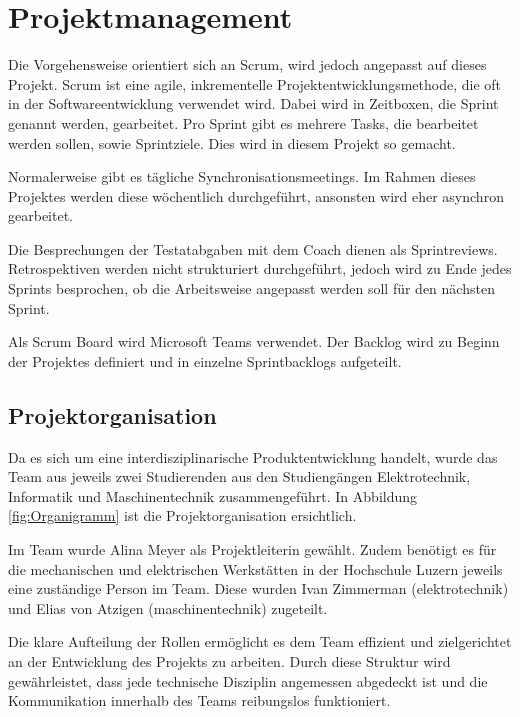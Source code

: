 \section{Projektmanagement}

Die Vorgehensweise orientiert sich an Scrum, wird jedoch angepasst auf dieses Projekt.
Scrum ist eine agile, inkrementelle Projektentwicklungsmethode, die oft in der Softwareentwicklung verwendet wird. Dabei wird in Zeitboxen, die Sprint genannt werden, gearbeitet. Pro Sprint gibt es mehrere Tasks, die bearbeitet werden sollen, sowie Sprintziele. Dies wird in diesem Projekt so gemacht.\cite{wikipedia-scrum}

Normalerweise gibt es tägliche Synchronisationsmeetings. Im Rahmen dieses Projektes werden diese wöchentlich durchgeführt, ansonsten wird eher asynchron gearbeitet.

Die Besprechungen der Testatabgaben mit dem Coach dienen als Sprintreviews. Retrospektiven werden nicht strukturiert durchgeführt, jedoch wird zu Ende jedes Sprints besprochen, ob die Arbeitsweise angepasst werden soll für den nächsten Sprint.

Als Scrum Board wird Microsoft Teams verwendet. Der Backlog wird zu Beginn der Projektes definiert und in einzelne Sprintbacklogs aufgeteilt.

\subsection{Projektorganisation}

Da es sich um eine interdisziplinarische Produktentwicklung handelt, wurde das Team aus jeweils zwei Studierenden aus den Studiengängen Elektrotechnik, Informatik und Maschinentechnik zusammengeführt. In Abbildung \ref{fig:Organigramm} ist die Projektorganisation ersichtlich. 

Im Team wurde Alina Meyer als Projektleiterin gewählt. Zudem benötigt es für die mechanischen und elektrischen Werkstätten in der Hochschule Luzern jeweils eine zuständige Person im Team. Diese wurden Ivan Zimmerman (\acrshort{elektrotechnik}) und Elias von Atzigen (\acrshort{maschinentechnik}) zugeteilt.

Die klare Aufteilung der Rollen ermöglicht es dem Team effizient und zielgerichtet an der Entwicklung des Projekts zu arbeiten. Durch diese Struktur wird gewährleistet, dass jede technische Disziplin angemessen abgedeckt ist und die Kommunikation innerhalb des Teams reibungslos funktioniert.

